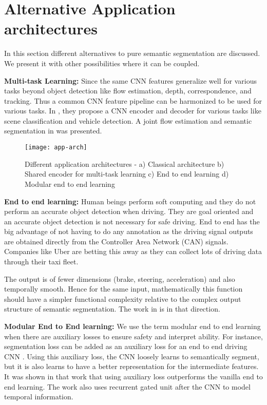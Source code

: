 \documentclass[conference]{IEEEtran}
\begin{document}
\section{Alternative Application architectures }\label{sec:alternative}
In this section different alternatives to pure semantic segmentation are discussed. We present it with other possibilities where it can be coupled.

\textbf{Multi-task Learning:} Since the same CNN features generalize well for various tasks beyond object detection like flow estimation, depth, correspondence, and tracking. Thus a common CNN feature pipeline can be harmonized to be used for various tasks. In \cite{teichmann2016multinet}, they propose a CNN encoder and decoder for various tasks like scene classification and vehicle detection. A joint flow estimation and semantic segmentation in \cite{DBLP:journals/corr/HurR16} was presented. 

\begin{figure}[!t]
\centering
\texttt{[image: app-arch]}
\caption{Different application architectures - a) Classical architecture b) Shared encoder for multi-task learning c) End to end learning d) Modular end to end learning}
\label{multinet}
\end{figure}\textbf{End to end learning:} Human beings perform soft computing and they do not perform an accurate object detection when driving. They are goal oriented and an accurate object detection is not necessary for safe driving. End to end has the big advantage of not having to do any annotation as the driving signal outputs are obtained directly from the Controller Area Network (CAN) signals. Companies like Uber are betting this away as they can collect lots of driving data through their taxi fleet. 

The output is of fewer dimensions (brake, steering, acceleration) and also temporally smooth. Hence for the same input, mathematically this function should have a simpler functional complexity relative to the complex output structure of semantic segmentation. The work in \cite{bojarski2016end}\cite{muller2005off} is in that direction.

\textbf{Modular End to End learning:} We use the term modular end to end learning when there are auxiliary losses to ensure safety and interpret ability. For instance, segmentation loss can be added as an auxiliary loss for an end to end driving CNN \cite{xu2016end}. Using this auxiliary loss, the CNN loosely learns to semantically segment, but it is also learns to have a better representation for the intermediate features. It was shown in that work that using auxiliary loss outperforms the vanilla end to end learning. The work also uses recurrent gated unit after the CNN to model temporal information.
\end{document}
